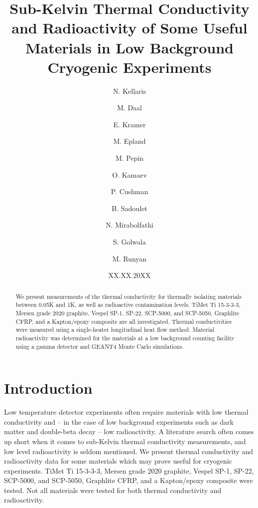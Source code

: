 \documentclass[final]{svjour2}
\begin{document}
\newcommand{\hdblarrow}{H\makebox[0.9ex][l]{$\downdownarrows$}-}
\title{Sub-Kelvin Thermal Conductivity and Radioactivity of Some Useful Materials in Low Background Cryogenic Experiments}

\author{N. Kellaris \and M. Daal \and E. Kramer \and M. Epland \and M. Pepin \and O. Kamaev \and P. Cushman \and B. Sadoulet \and N. Mirabolfathi \and S. Golwala \and M. Runyan}


\date{XX.XX.20XX}

\maketitle


\begin{abstract}
     We present measurements of the thermal conductivity for thermally isolating materials between 0.05K and 1K, as well as radioactive contamination levels. TiMet Ti 15-3-3-3, Mersen grade 2020 graphite, Vespel SP-1, SP-22, SCP-5000, and SCP-5050, Graphlite CFRP, and a Kapton/epoxy composite are all investigated. Thermal conductivities were measured using a single-heater longitudinal heat flow method. Material radioactivity was determined for the materials at a low background counting facility using a gamma detector and GEANT4 Monte Carlo simulations.



\end{abstract}

\section{Introduction}
Low temperature detector experiments often require materials with low thermal conductivity and -- in the case of low background experiments such as dark matter and double-beta decay -- low radioactivity. A literature search often comes up short when it comes to sub-Kelvin thermal conductivity measurements, and low level radioactivity is seldom mentioned. We present thermal conductivity and radioactivity data for some materials which may prove useful for cryogenic experiments. TiMet Ti 15-3-3-3, Mersen grade 2020 graphite, Vespel SP-1, SP-22, SCP-5000, and SCP-5050, Graphlite CFRP, and a Kapton/epoxy composite were tested. Not all materials were tested for both thermal conductivity and radioactivity.
\end{document}
